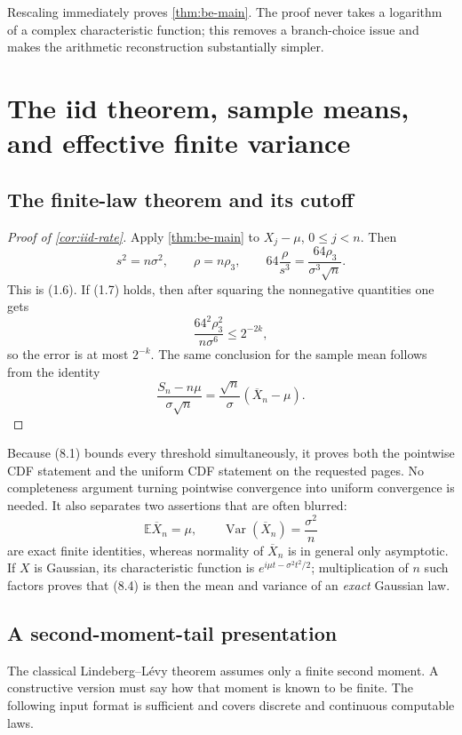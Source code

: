 \documentclass[11pt]{article}
\newcommand{\E}{\mathbb E}
\newcommand{\Var}{\operatorname{Var}}
\begin{document}
Rescaling immediately proves \cref{thm:be-main}.  The proof never takes a
logarithm of a complex characteristic function; this removes a branch-choice
issue and makes the arithmetic reconstruction substantially simpler.

\section{The iid theorem, sample means, and effective finite variance}
\label{sec:iid}

\subsection{The finite-law theorem and its cutoff}

\begin{proof}[Proof of \cref{cor:iid-rate}]
Apply \cref{thm:be-main} to
\(X_j-\mu\), \(0\le j<n\).  Then
\[
 s^2=n\sigma^2,
 \qquad
 \rho=n\rho_3,
 \qquad
 64\frac{\rho}{s^3}
 =\frac{64\rho_3}{\sigma^3\sqrt n}.                  \tag{8.1}
\]
This is (1.6).  If (1.7) holds, then after squaring the nonnegative
quantities one gets
\[
 \frac{64^2\rho_3^2}{n\sigma^6}\le2^{-2k},           \tag{8.2}
\]
so the error is at most \(2^{-k}\).  The same conclusion for the sample
mean follows from the identity
\[
 \frac{S_n-n\mu}{\sigma\sqrt n}
 =\frac{\sqrt n}{\sigma}(\overline X_n-\mu).          \tag{8.3}
\]
\end{proof}

Because (8.1) bounds every threshold simultaneously, it proves both the
pointwise CDF statement and the uniform CDF statement on the requested
pages.  No completeness argument turning pointwise convergence into uniform
convergence is needed.  It also separates two assertions that are often
blurred:
\[
 \E\overline X_n=\mu,
 \qquad
 \Var(\overline X_n)=\frac{\sigma^2}{n}               \tag{8.4}
\]
are exact finite identities, whereas normality of \(\overline X_n\) is in
general only asymptotic.  If \(X\) is Gaussian, its characteristic function
is \(e^{i\mu t-\sigma^2t^2/2}\); multiplication of \(n\) such factors proves
that (8.4) is then the mean and variance of an \emph{exact} Gaussian law.

\subsection{A second-moment-tail presentation}

The classical Lindeberg--L\'evy theorem assumes only a finite second moment.
A constructive version must say how that moment is known to be finite.
The following input format is sufficient and covers discrete and continuous
computable laws.
\end{document}

